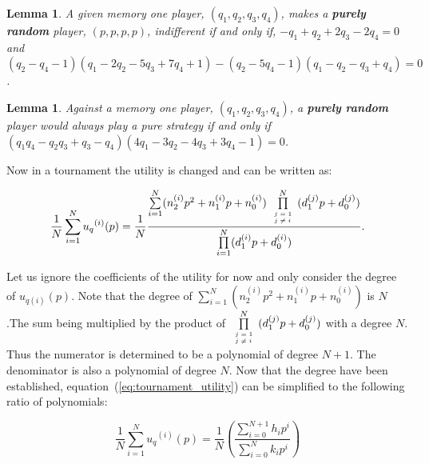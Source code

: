 \documentclass[10pt]{article}
\newtheorem{lemma}[theorem]{Lemma}
\begin{document}
\begin{lemma}\label{lemma:constant}
    A given memory one player, \((q_1, q_2, q_3, q_4)\), makes a \textbf{purely
    random} player, \((p, p, p, p)\), indifferent if and only if, 
    \(-q_1 + q_2 + 2q_3 - 2q_4 = 0 \) and 
    \((q_2 - q_4 - 1)(q_1 - 2q_2 - 5q_3 + 7q_4 + 1) -(q_2 - 5q_4 - 1)(q_1 - q_2 - q_3 + q_4) = 0 \).
    \end{lemma}

\begin{lemma}\label{lemma:linear}
    Against a memory one player, \((q_1, q_2, q_3, q_4)\), a \textbf{purely random}
    player would always play a pure strategy if and only if
    \((q_{1}q_{4} - q_{2} q_{3} + q_{3} - q_{4}) (4 q_{1} - 3 q_{2} - 4 q_{3} + 3 
    q_{4} - 1) = 0\).
    \end{lemma}

Now in a tournament the utility is changed and can be written as:

\begin{equation}\label{eq:tournament_utility}
        \frac{1}{N} \sum_{i=1} ^ {N} {u_q}^{(i)} (p) = \frac{1}{N}
        \frac{\sum\limits_{i=1} ^ {N} (n_2^{(i)} p^2 + n_1^{(i)} p + n_0^
        {(i)}) \prod\limits_{\tiny\begin{array}{l} j=1 \\ j \neq i \end{array}} ^ 
        N (d_1 ^ {(j)}p +
        d_0 ^ {(j)})}{\prod\limits_{i=1} ^ N (d_1 ^ {(i)}p +
        d_0 ^ {(i)})}.
\end{equation}

Let us ignore the coefficients of the utility for now and only consider the degree of \(u_{q(i)} (p)\). Note that the degree of 
\(\sum\limits_{i=1} ^ {N}(n_2^{(i)} p^2 + n_1^{(i)} p + n_0^{(i)})\) is \(N\)
.The sum being multiplied by the product of \(\prod\limits_{\tiny\begin{array}
{l} j=1 \\ j \neq i \end{array}} ^ N (d_1 ^ {(j)}p + d_0 ^ {(j)})\) with a 
degree \(N\). Thus the numerator is determined to be a polynomial of degree 
\(N +1\). The denominator is also a polynomial of degree \(N\). Now that
the degree have been established, equation~(\ref{eq:tournament_utility}) can
be simplified to the following ratio of polynomials:

\begin{equation}\label{eq:utility_polynomial}
    \frac{1}{N} \sum_{i=1} ^ {N} {u_q}^{(i)} (p) =
    \frac{1}{N}\left(\frac{\sum\limits_{i=0}^{N+1} h_i p^i} {\sum\limits_{i=0}^{N}
    k_i p^i}\right)
\end{equation}
\end{document}
